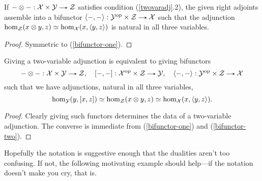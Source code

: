 \begin{lemma}
  \label{bifunctor-two}
  If $- \otimes - : \X \times \Y \to \Z$ satisfies condition
  (\ref{twovaradj}.2), the given right adjoints assemble into a
  bifunctor $\langle -,- \rangle : \Y^\op \times \Z \to \X$ such that
  the adjunction $\hom_{\mathcal{Z}}(x \otimes y, z) \simeq \hom_{\mathcal{X}}(x, \langle
  y,z \rangle)$ is natural in all three variables.
\end{lemma}

\begin{proof}
  Symmetric to (\ref{bifunctor-one}).
\end{proof}

\begin{corollary}
  \label{twovaradj-strong}
  Giving a two-variable adjunction is equivalent to giving bifunctors
  \[
  - \otimes - : \X \times \Y \to \Z, \quad [-,-] : \X^\op \times \Z
  \to \Y, \quad \langle -,- \rangle : \Y^\op \times \Z \to \X
  \]
  such that we have adjunctions, natural in all three variables,
  \[
  \hom_{\mathcal{Y}}(y, [x,z]) \simeq \hom_{\mathcal{Z}}(x \otimes y, z) \simeq \hom_{\mathcal{X}}(x,
  \langle y,z \rangle).
  \]
\end{corollary}

\begin{proof}
  Clearly giving such functors determines the data of a two-variable
  adjunction. The converse is immediate from (\ref{bifunctor-one}) and
  (\ref{bifunctor-two}).
\end{proof}

\begin{remark}
  Hopefully the notation is suggestive enough that the dualities
  aren't too confusing. If not, the following motivating example
  should help---if the notation doesn't make you cry, that is.
\end{remark}

\newcommand{\bHom}{\operatorname{\textbf{Hom}}}
\newcommand{\bhom}{\operatorname{\textbf{hom}}}

